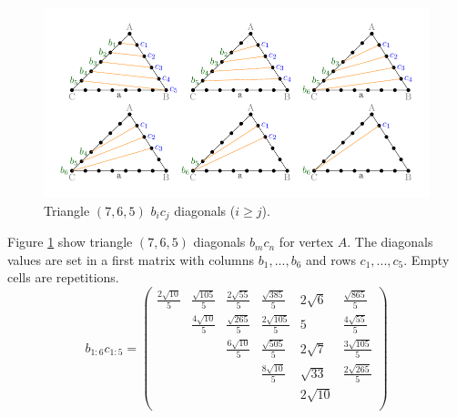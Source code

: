 \documentclass[11pt]{article}
\begin{document}
\begin{figure}[htp]
\centering
\includegraphics[scale=1]{t765bc}
\caption{Triangle $(7,6,5)$ $b_ic_j$ diagonals ($i \ge j$).}
\label{t765bc}
\end{figure}
Figure \ref{t765bc} show triangle $(7,6,5)$ diagonals $b_mc_n$ for vertex $A$.
The diagonals values are set in a first matrix with columns $b_1,...,b_6$ and rows $c_1,...,c_5$. Empty cells are repetitions.
\begin{equation}\label{eq:appendrow}
b_{1:6}c_{1:5} = \left(\begin{array}{cccccc}
\frac{2\sqrt{10}}{5} & \frac{\sqrt{105}}{5} & \frac{2\sqrt{55}}{5} & \frac{\sqrt{385}}{5} & 2\sqrt{6} & \frac{\sqrt{865}}{5} \\
& \frac{4\sqrt{10}}{5} & \frac{\sqrt{265}}{5} & \frac{2\sqrt{105}}{5} & 5 & \frac{4\sqrt{55}}{5} \\
& & \frac{6\sqrt{10}}{5} & \frac{\sqrt{505}}{5} & 2\sqrt{7} & \frac{3\sqrt{105}}{5} \\
& & & \frac{8\sqrt{10}}{5} & \sqrt{33} & \frac{2\sqrt{265}}{5} \\
& & & & 2\sqrt{10} & \\
\end{array}\right)
\end{equation}
\end{document}
